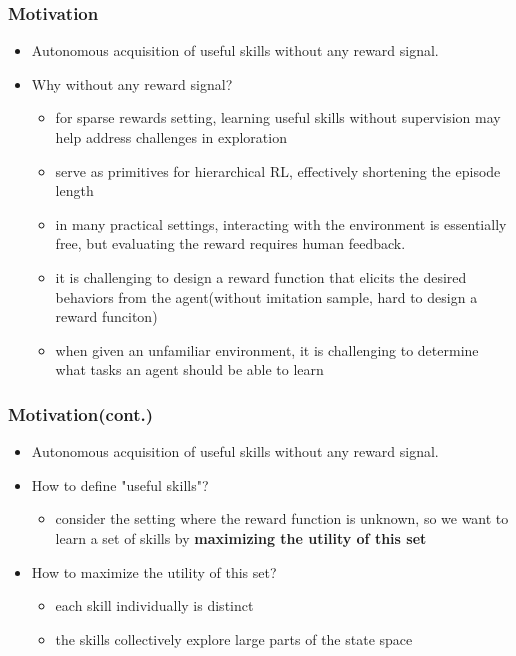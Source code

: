 \documentclass[aspectratio=169]{beamer}
\begin{document}
\begin{frame}
  \frametitle{Motivation}
  \begin{itemize}
    \item Autonomous acquisition of useful skills without any reward signal.
    \item Why without any reward signal?
    \begin{itemize}
      \item for sparse rewards setting, learning useful skills without supervision may help address challenges in exploration
      \item serve as primitives for hierarchical RL, effectively shortening the episode length
      \item in many practical settings, interacting with the environment is essentially free, but evaluating the reward requires human feedback.
      \item it is challenging to design a reward function that elicits the desired behaviors from the agent(without imitation sample, hard to design a reward funciton)
      \item when given an unfamiliar environment, it is challenging to determine what tasks an agent should be able to learn
    \end{itemize}
  \end{itemize}
\end{frame}

\begin{frame}
  \frametitle{Motivation(cont.)}
  \begin{itemize}
    \item Autonomous acquisition of useful skills without any reward signal.
    \item How to define "useful skills"?
    \begin{itemize}
      \item consider the setting where the reward function is unknown, so we want to learn a set of skills by \textbf{maximizing the utility of this set}
    \end{itemize}
    \item How to maximize the utility of this set?
    \begin{itemize}
      \item each skill individually is distinct
      \item the skills collectively explore large parts of the state space
    \end{itemize}
    \end{itemize}
\end{frame}
\end{document}
